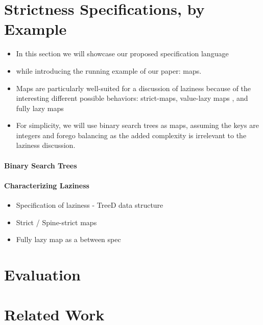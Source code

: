 \documentclass[acmsmall,review]{acmart}\settopmatter{}
\begin{document}
\section{Strictness Specifications, by Example}
\label{sec:quickchick}


\begin{itemize}
\item In this section we will showcase our proposed specification language 
\item while introducing the running example of our paper: maps.
\item Maps are particularly well-suited for a discussion of laziness because of the interesting different
possible behaviors: strict-maps, value-lazy maps , and fully lazy maps
\item For simplicity, we will use binary search trees as maps, assuming the keys are integers and forego balancing
as the added complexity is irrelevant to the laziness discussion. 
\end{itemize}

\paragraph*{Binary Search Trees}


\paragraph*{Characterizing Laziness}

\begin{itemize}
\item Specification of laziness - TreeD data structure 
\item Strict / Spine-strict maps
\item Fully lazy map as a between spec
\end{itemize}

\section{Evaluation}
\label{sec:eval}

\section{Related Work}
\label{sec:related}
\end{document}
